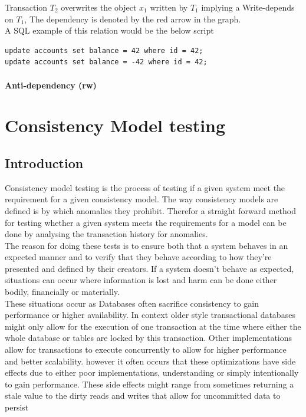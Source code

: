 \documentclass[a4paper,10pt,titlepage]{report}
\begin{document}
Transaction $T_2$ overwrites the object $x_1$ written by $T_1$ implying a Write-depends on $T_1$, The dependency is denoted by the red arrow in the graph. \\

A SQL example of this relation would be the below script

\begin{lstlisting}
update accounts set balance = 42 where id = 42;
update accounts set balance = -42 where id = 42;
\end{lstlisting}

\subsubsection{Anti-dependency (rw)}
        
\newpage

\chapter{Consistency Model testing}

\section{Introduction}
Consistency model testing is the process of testing if a given system meet the requirement for a given consistency model. The way consistency models are defined is by which anomalies they prohibit. Therefor a straight forward method for testing whether a given system meets the requirements for a model can be done by analysing the transaction history for anomalies.\\
\vspace{5mm}
The reason for doing these tests is to ensure both that a system behaves in an expected manner and to verify that they behave according to how they're presented and defined by their creators. If a system doesn't behave as expected, situations can occur where information is lost and harm can be done either bodily, financially or materially. \\ \vspace{5mm}
These situations occur as Databases often sacrifice consistency to gain performance or higher availability. In context older style transactional databases might only allow for the execution of one transaction at the time where either the whole database or tables are locked by this transaction. Other implementations allow for transactions to execute concurrently to allow for higher performance and better scalability. however it often occurs that these optimizations have side effects due to either poor implementations, understanding or simply intentionally to gain performance. These side effects might range from sometimes returning a stale value to the dirty reads and writes that allow for uncommitted data to persist 
\end{document}
